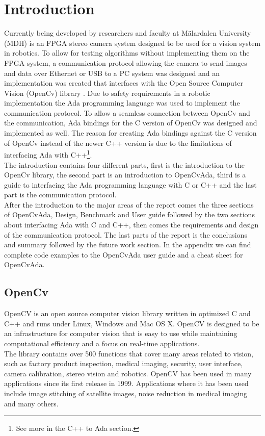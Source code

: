 \chapter{Introduction}
Currently being developed by researchers and faculty at Mälardalen University (MDH) is an FPGA stereo camera system designed to be used for a vision system in robotics. To allow for testing algorithms without implementing them on the FPGA system, a communication protocol allowing the camera to send images and data over Ethernet or USB to a PC system was designed and an implementation was created that interfaces with the Open Source Computer Vision (OpenCv) library \cite{opencv2011}. Due to safety requirements in a robotic implementation the Ada programming language was used to implement the communication protocol. To allow a seamless connection between OpenCv and the communication, Ada bindings for the C version of OpenCv was designed and implemented as well. The reason for creating Ada bindings against the C version of OpenCv instead of the newer C++ version is due to the limitations of interfacing Ada with C++\footnote{See more in the C++ to Ada section.}.
\\
The introduction contains four different parts, first is the introduction to the OpenCv library, the second part is an introduction to OpenCvAda, third is a guide to interfacing the Ada programming language with C or C++ and the last part is the communication protocol.
\\
After the introduction to the major areas of the report comes the three sections of OpenCvAda, Design, Benchmark and User guide followed by the two sections about interfacing Ada with C and C++, then comes the requirements and design of the communication protocol. The last parts of the report is the conclusions and summary followed by the future work section. In the appendix we can find complete code examples to the OpenCvAda user guide and a cheat sheet for OpenCvAda.
\section{OpenCv}
OpenCV is an open source computer vision library written in optimized C and C++ and runs under Linux, Windows and Mac OS X. OpenCV is designed to be an infrastructure for computer vision that is easy to use while maintaining computational efficiency and a focus on real-time applications.
\\
The library contains over 500 functions that cover many areas related to vision, such as factory product inspection, medical imaging, security, user interface, camera calibration, stereo vision and robotics. OpenCV has been used in many applications since its first release in 1999. Applications where it has been used include image stitching of satellite images, noise reduction in medical imaging and many others.
